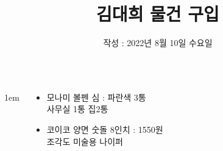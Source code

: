 \documentclass[	20pt, 
							a1paper, 
							portrait, %
							margin=0mm, %
							innermargin=10mm,  		%
							colspace=5mm, 
							subcolspace=0mm
							]{tikzposter}
\title{김대희 물건 구입}
\author{ 작성 : 2022년 8월 10일 수요일 }
\begin{document}
	\maketitle

	\begin{columns}


			{
					\setlength{\leftmargini}{7em}
					\setlength{\labelsep} {1em}
				\begin{LARGE}
					\begin{itemize}
					\item 모나미 볼펜 심 : 파란색 3통\\
							사무실 1통 집2통
					\item 코이코 양면 숫돌 8인치 : 1550원 \\
						조각도  미술용 나이퍼
					\end{itemize}
				\end{LARGE}
			}






\end{columns}
\end{document}
